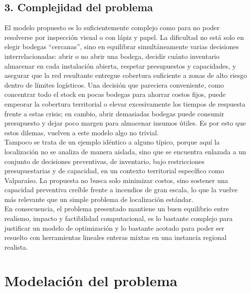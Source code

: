 \documentclass[letterpaper]{article}
\begin{document}
\begin{flushleft}
\subsection{3. Complejidad del problema}
El modelo propuesto es lo suficientemente complejo como para no poder resolverse por inspecci\'on visual o con l\'apiz y papel. La dificultad no est\'a solo en elegir bodegas ``cercanas'', sino en equilibrar simult\'aneamente varias decisiones interrelacionadas: abrir o no abrir una bodega, decidir cu\'anto inventario almacenar en cada instalaci\'on abierta, respetar presupuestos y capacidades, y asegurar que la red resultante entregue cobertura suficiente a zonas de alto riesgo dentro de l\'imites log\'isticos. Una decisi\'on que pareciera conveniente, como concentrar todo el stock en pocas bodegas para ahorrar costos fijos, puede empeorar la cobertura territorial o elevar excesivamente los tiempos de respuesta frente a estas crisis; en cambio, abrir demasiadas bodegas puede consumir presupuesto y dejar poco margen para almacenar insumos \'utiles. Es por esto que estos dilemas, vuelven a este modelo algo no trivial.\\

Tampoco se trata de un ejemplo id\'entico a alguno t\'ipico, porque aqu\'i la localizaci\'on no se analiza de manera aislada, sino que se encuentra enlazada a un conjunto de decisiones preventivas, de inventario, bajo restricciones presupuestarias y de capacidad, en un contexto territorial espec\'ifico como Valpara\'iso. La propuesta no busca solo minimizar costos, sino sostener una capacidad preventiva cre\'ible frente a incendios de gran escala, lo que la vuelve m\'as relevante que un simple problema de localizaci\'on est\'andar.\\

En consecuencia, el problema presentado mantiene un buen equilibrio entre realismo, impacto y factibilidad computacional, es lo bastante complejo para justificar un modelo de optimizaci\'on y lo bastante acotado para poder ser resuelto con herramientas lineales enteras mixtas en una instancia regional realista.

\section{Modelaci\'on del problema}


\end{flushleft}
\end{document}
